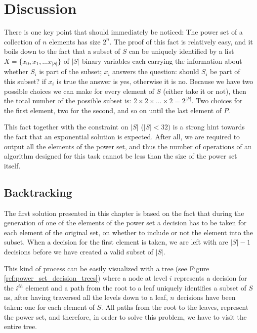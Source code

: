 \section{Discussion}
\label{sec:powerset:discussion}
There is one key point that should immediately be noticed: The power set of a collection of
    $n$ elements has size $2^n$. The proof of this fact is relatively easy, and it boils
    down to the fact that a subset of $S$ can be uniquely identified by a list $X=\{x_0,x_1,\ldots x_{|S|}\}$ 
    of $|S|$ binary variables each carrying the information about whether 
    $S_i$ is part of the subset; $x_i$ answers the question: should $S_i$ be part of this subset? if $x_i$ is true the answer is yes, otherwise it is no.
    Because we have two possible choices we can make for every element of $S$ (either
    take it or not), then the total number of the possible subset is: $2 \times 2
    \times \ldots \times 2 = 2^{|P|}$. 
    Two choices for the first element, two for the second, and so
    on until the last element of $P$.
    
    This fact together with the constraint on $|S|$ ($|S| < 32)$ is a strong hint towards the fact
    that an exponential solution is expected.
    After all, we are required to output all the elements
    of the power set, and thus the number of operations of an algorithm designed for this task cannot be less
    than the size of the power set itself. 


\subsection{Backtracking}
The first solution presented in this chapter is based on the fact that  during the generation of
one of the elements of the power set a decision has to be taken for each element of the original
set, on whether to include or not the element into the subset. 
When a decision for the first element is taken, we are left with are $|S|-1$ decisions
before we have created a valid subset of $|S|$.

This kind of process can be easily visualized with a tree (see Figure \ref{ref:power_set_decision_trees}) 
where a node at level $i$
represents a decision for the $i^{th}$ element and a path from the root to a leaf uniquely
identifies a subset of $S$ as, after having traversed all the levels down to a leaf, $n$ decisions have been taken: 
one for each element of $S$. 
All paths from the root to the leaves, represent the power set, and therefore, in
order to solve this problem, we have to visit the entire tree.


